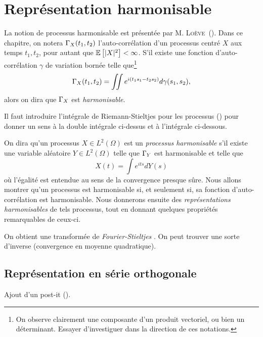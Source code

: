 \section{Représentation harmonisable}
La notion de processus harmonisable est présentée par
M. \textsc{Loève}~(\cite{loeve1978}). Dans ce chapitre, on notera
$\Gamma_X(t_1,t_2)$ l'auto-corrélation d'un processus centré $X$ aux
temps $t_1, t_2$, pour autant que $\mathbb{E}\left[|X|^2\right] < \infty$. S'il existe
une fonction d'auto-corrélation $\gamma$ de variation bornée telle
que\footnote{On observe clairement une composante d'un produit
  vectoriel, ou bien un déterminant. Essayer d'investiguer dans la
  direction de ces notations.}
\[ \Gamma_X(t_1,t_2) = \iint e^{i(t_1s_1 - t_2s_2)} d\gamma(s_1,s_2)
  ,\] alors on dira que $\Gamma_X$ est \emph{harmonisable}.

\begin{prerequis}
  Il faut introduire l'intégrale de Riemann-Stieltjes pour les
  processus (\cite[p.~138]{loeve1978}) pour donner un sens à la double
  intégrale ci-dessus et à l'intégrale ci-dessous.
\end{prerequis}


On dira qu'un processus $X\in L^2(\Omega)$ est un \emph{processus
  harmonisable} s'il existe une variable aléatoire $Y\in L^2(\Omega)$
telle que $\Gamma_Y$ est harmonisable et telle que
\begin{equation}
  \label{eqn:rep-harm-proc}
  X(t) = \int e^{its} dY(s)
\end{equation}
où l'égalité est entendue au sens de la convergence presque sûre. Nous
allons montrer qu'un processus est harmonisable si, et seulement si,
sa fonction d'auto-corrélation est harmonisable. Nous donnerons
ensuite des \emph{représentations harmonisables} de tels processus,
tout en donnant quelques propriétés remarquables de ceux-ci.

\begin{alert}
  On obtient une \og transformée de \emph{Fourier-Stieltjes} \fg{}. On
  peut trouver une sorte d'inverse (convergence en moyenne
  quadratique).
\end{alert}

\subsection{Représentation en série orthogonale}

\begin{alert}
  Ajout d'un post-it (\cite[p.~143]{loeve1978}).
\end{alert}

